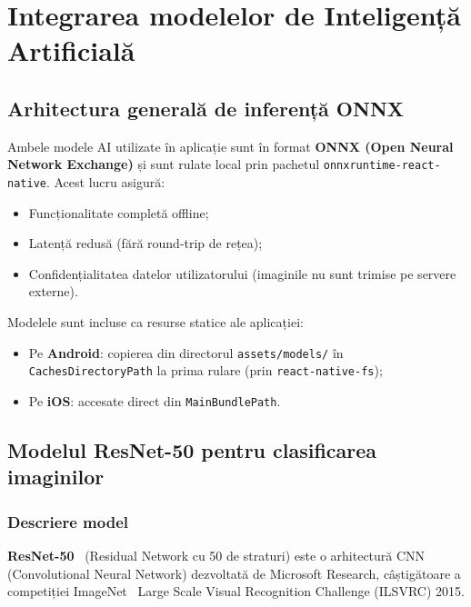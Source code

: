 \documentclass[12pt, a4paper, twoside]{report}
\numberwithin{equation}{section}
\begin{document}
\chapter{Integrarea modelelor de Inteligență Artificială}

\section{Arhitectura generală de inferență ONNX}

Ambele modele AI utilizate în aplicație sunt în format \textbf{ONNX (Open Neural Network
Exchange)} și sunt rulate local prin pachetul \texttt{onnxruntime-react-native}.
Acest lucru asigură:
\begin{itemize}
  \item Funcționalitate completă offline;
  \item Latență redusă (fără round-trip de rețea);
  \item Confidențialitatea datelor utilizatorului (imaginile nu sunt trimise pe servere
    externe).
\end{itemize}

Modelele sunt incluse ca resurse statice ale aplicației:
\begin{itemize}
  \item Pe \textbf{Android}: copierea din directorul \texttt{assets/models/} în
    \texttt{CachesDirectoryPath} la prima rulare (prin \texttt{react-native-fs});
  \item Pe \textbf{iOS}: accesate direct din \texttt{MainBundlePath}.
\end{itemize}

\section{Modelul ResNet-50 pentru clasificarea imaginilor}

\subsection{Descriere model}

\textbf{ResNet-50}~\cite{resnet} (Residual Network cu 50 de straturi) este o arhitectură CNN
(Convolutional Neural Network) dezvoltată de Microsoft Research, câștigătoare a
competiției ImageNet~\cite{imageNet} Large Scale Visual Recognition Challenge (ILSVRC) 2015.
\end{document}
